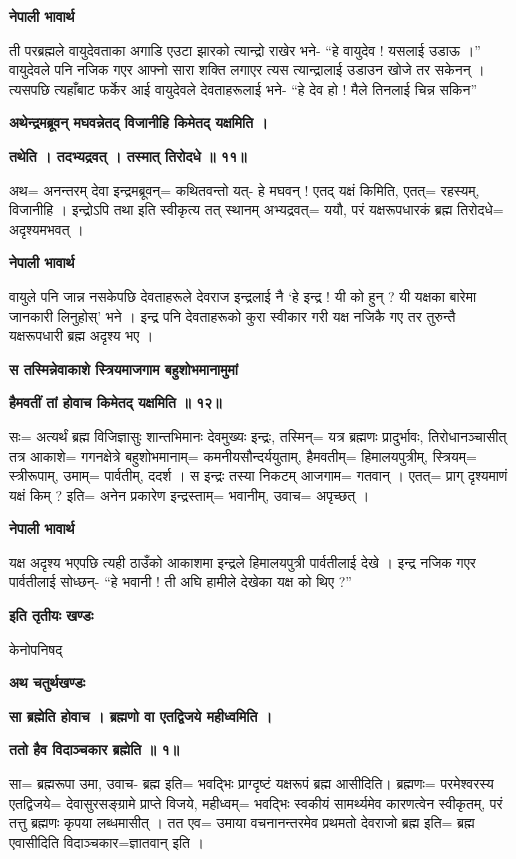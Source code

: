 \documentclass[11pt, a5paper]{article}
\begin{document}
\textbf{नेपाली भावार्थ}

ती परब्रह्मले वायुदेवताका अगाडि एउटा झारको त्यान्द्रो राखेर भने- “हे वायुदेव ! यसलाई उडाऊ ।” वायुदेवले पनि नजिक गएर आफ्नो सारा शक्ति लगाएर त्यस त्यान्द्रालाई उडाउन खोजे तर सकेनन् । त्यसपछि त्यहाँबाट फर्केर आई वायुदेवले देवताहरूलाई भने- “हे देव हो ! मैले तिनलाई चिन्न सकिन”

\textbf{अथेन्द्रमब्रूवन् मघवन्नेतद् विजानीहि किमेतद् यक्षमिति ।}

\textbf{तथेति । तदभ्यद्रवत् । तस्मात् तिरोदधे ॥ ११॥}

अथ= अनन्तरम् देवा इन्द्रमब्रूवन्= कथितवन्तो यत्- हे मघवन् ! एतद् यक्षं किमिति, एतत्= रहस्यम्, विजानीहि । इन्द्रोऽपि तथा इति स्वीकृत्य तत् स्थानम् अभ्यद्रवत्= ययौ, परं यक्षरूपधारकं ब्रह्म तिरोदधे= अदृश्यमभवत् ।

\textbf{नेपाली भावार्थ}

वायुले पनि जान्न नसकेपछि देवताहरूले देवराज इन्द्रलाई नै ‘हे इन्द्र ! यी को हुन् ? यी यक्षका बारेमा जानकारी लिनुहोस्’ भने । इन्द्र पनि देवताहरूको कुरा स्वीकार गरी यक्ष नजिकै गए तर तुरुन्तै यक्षरूपधारी ब्रह्म अदृश्य भए ।

\textbf{स तस्मिन्नेवाकाशे स्त्रियमाजगाम बहुशोभमानामुमां}

\textbf{हैमवतीं तां होवाच किमेतद् यक्षमिति ॥ १२॥}

सः= अत्यर्थं ब्रह्म विजिज्ञासुः शान्तभिमानः देवमुख्यः इन्द्रः, तस्मिन्= यत्र ब्रह्मणः प्रादुर्भावः, तिरोधानञ्चासीत् तत्र आकाशे= गगनक्षेत्रे बहुशोभमानाम्= कमनीयसौन्दर्ययुताम्, हैमवतीम्= हिमालयपुत्रीम्, स्त्रियम्= स्त्रीरूपाम्, उमाम्= पार्वतीम्, ददर्श । स इन्द्रः तस्या निकटम् आजगाम= गतवान् । एतत्= प्राग् दृश्यमाणं यक्षं किम् ? इति= अनेन प्रकारेण इन्द्रस्ताम्= भवानीम्, उवाच= अपृच्छत् ।

\textbf{नेपाली भावार्थ}

यक्ष अदृश्य भएपछि त्यही ठाउँको आकाशमा इन्द्रले हिमालयपुत्री पार्वतीलाई देखे । इन्द्र नजिक गएर पार्वतीलाई सोध्छन्- “हे भवानी ! ती अघि हामीले देखेका यक्ष को थिए ?”

\textbf{इति तृतीयः खण्डः}

केनोपनिषद्

\textbf{अथ चतुर्थखण्डः}

\textbf{सा ब्रह्मेति होवाच । ब्रह्मणो वा एतद्विजये महीध्वमिति ।}

\textbf{ततो हैव विदाञ्चकार ब्रह्मेति ॥ १॥}

सा= ब्रह्मरूपा उमा, उवाच- ब्रह्म इति= भवद्भिः प्राग्दृष्टं यक्षरूपं ब्रह्म आसीदिति। ब्रह्मणः= परमेश्वरस्य एतद्विजये= देवासुरसङ्‌ग्रामे प्राप्ते विजये, महीध्वम्= भवद्भिः स्वकीयं सामर्थ्यमेव कारणत्वेन स्वीकृतम्, परं तत्तु ब्रह्मणः कृपया लब्धमासीत् । तत एव= उमाया वचनानन्तरमेव प्रथमतो देवराजो ब्रह्म इति= ब्रह्म एवासीदिति विदाञ्चकार=ज्ञातवान् इति ।
\end{document}
